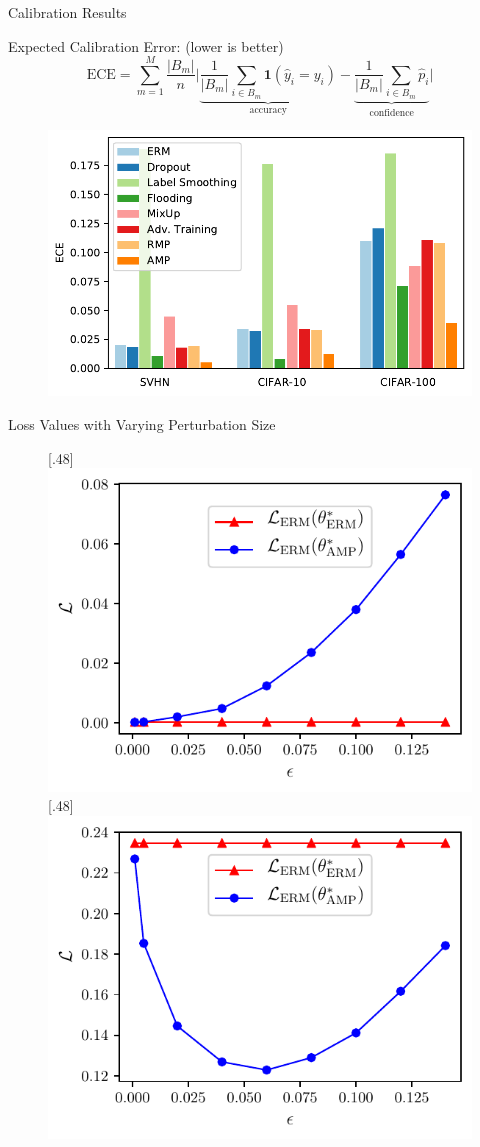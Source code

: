 \begin{frame}{Calibration Results}

Expected Calibration Error: (lower is better)
\begin{equation*}
\text{ECE}=\sum_{m=1}^M\frac{|B_m|}{n}\bigg\vert\underbrace{\frac{1}{|B_m|}\sum_{i\in B_m}\mathbf{1}(\hat{y}_i=y_i)}_{\text{accuracy}}-\underbrace{\frac{1}{|B_m|}\sum_{i\in B_m}\hat{p}_i}_{\text{confidence}}\bigg\vert
\end{equation*}
\vspace{-0.5em}

\begin{figure}
\includegraphics[width=.46\textwidth]{figs/ece.pdf}
\end{figure}

\vspace{1em}

\end{frame}

\begin{frame}{Loss Values with Varying Perturbation Size}

\begin{figure}
[.48\textwidth]{\includegraphics[width=.45\textwidth]{figs/tune_a.pdf}}
[.48\textwidth]{\includegraphics[width=.45\textwidth]{figs/tune_b.pdf}}
\end{figure}

\end{frame}

